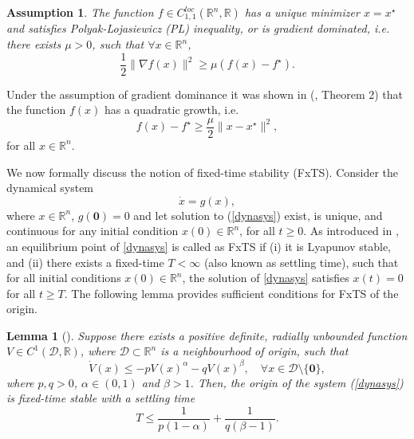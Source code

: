 \documentclass[letterpaper]{article}
\newtheorem{lemma}{Lemma} %
\newtheorem{assumption}{Assumption}
\begin{document}
\begin{assumption} \label{plineq}
The function $f\in C_{1,1}^{loc}(\mathbb{R}^n, \mathbb{R})$ has a unique minimizer $x=x^\star$ and satisfies Polyak-Lojasiewicz (PL) inequality, or is gradient dominated, i.e. there exists $\mu>0$, such that $\forall x\in \mathbb{R}^n$, 
\begin{equation} \label{grad_dom}
\frac{1}{2}\|\nabla f(x)\|^2 \geq \mu(f(x)-f^\star).
\end{equation}
\end{assumption}
Under the assumption of gradient dominance it was shown in (\cite{karimi2016linear}, Theorem 2) that the function $f(x)$ has a quadratic growth, i.e. 
\begin{equation} \label{quadgrowth}
f(x)-f^\star \geq \frac{\mu}{2}\|x-x^\star\|^2,
\end{equation}
for all $x\in \mathbb{R}^n$.

We now formally discuss the notion of fixed-time stability (FxTS). Consider the dynamical system 
\begin{equation} \label{dynasys}
\dot{x}=g(x), 
\end{equation}
where $x\in \mathbb{R}^n$, $g(\bm{0})=0$ and let solution to (\ref{dynasys}) exist, is unique, and continuous for any initial condition $x(0)\in \mathbb{R}^n$, for all $t\geq 0$. As introduced in \cite{polyakov2011nonlinear}, an equilibrium point of \eqref{dynasys} is called as FxTS if (i) it is Lyapunov stable, and (ii) there exists a fixed-time $T<\infty$ (also known as settling time), such that for all initial conditions $x(0)\in\mathbb R^n$, the solution of \eqref{dynasys} satisfies $x(t)\!=\!0$ for all $t\geq T$. The following lemma provides sufficient conditions for FxTS of the origin.

\begin{lemma}[\cite{polyakov2011nonlinear}] \label{fxts_lemma}
Suppose there exists a positive definite, radially unbounded function $V\in C^1(\mathcal{D},\mathbb{R})$, where $\mathcal{D}\subset \mathbb{R}^n$ is a neighbourhood of origin, such that 
\begin{equation}\label{eq:dotV cond}
\dot{V}(x)\leq -pV(x)^{\alpha} -qV(x)^{\beta}, \quad \forall x\in \mathcal{D}\setminus \{\bm{0}\}, 
\end{equation}
where $p,q >0$, $\alpha \in (0,1)$ and $\beta>1$. Then, the origin of the system (\ref{dynasys}) is fixed-time stable with a settling time 
\begin{equation}
T \leq \frac{1}{p(1-\alpha)} + \frac{1}{q(\beta -1)} . 
\end{equation}
\end{lemma}
\end{document}
